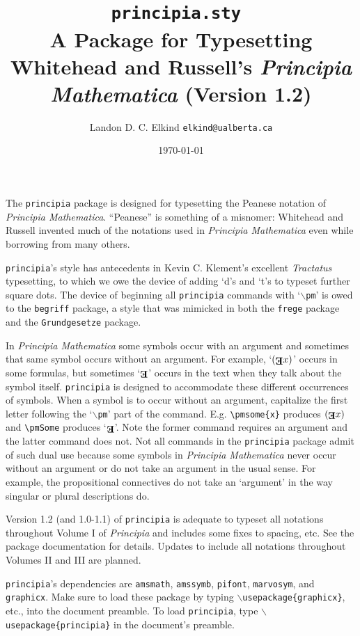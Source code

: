 \documentclass[12pt]{article}
\title{\texttt{principia.sty }\\ A \LaTeXe \space Package for Typesetting Whitehead and Russell's \textit{Principia Mathematica} (Version 1.2)}
\author{Landon D. C. Elkind \texttt{elkind@ualberta.ca}}
\date{\today}
\begin{document}
\maketitle
\onehalfspacing
The \texttt{principia} package is designed for typesetting the Peanese notation of \textit{Principia Mathematica}. ``Peanese'' is something of a misnomer: Whitehead and Russell invented much of the notations used in \textit{Principia Mathematica} even while borrowing from many others.

\texttt{principia}'s style has antecedents in Kevin C. Klement's excellent \textit{Tractatus} typesetting, to which we owe the device of adding `d's and `t's to typeset further square dots. The device of beginning all \texttt{principia} commands with `\texttt{$\backslash$pm}' is owed to the \texttt{begriff} package, a style that was mimicked in both the \texttt{frege} package and the \texttt{Grundgesetze} package. 

In \textit{Principia Mathematica} some symbols occur with an argument and sometimes that same symbol occurs without an argument. For example, `$\pmsome{x}$' occurs in some formulas, but sometimes `$\pmSome$' occurs in the text when they talk about the symbol itself. \texttt{principia} is designed to accommodate these different occurrences of symbols. When a symbol is to occur without an argument, capitalize the first letter following the `\texttt{$\backslash$pm}' part of the command. E.g. \verb|\pmsome{x}| produces $\pmsome{x}$ and \verb|\pmSome| produces `$\pmSome$'. Note the former command requires an argument and the latter command does not. Not all commands in the \texttt{principia} package admit of such dual use because some symbols in \textit{Principia Mathematica} never occur without an argument or do not take an argument in the usual sense. For example, the propositional connectives do not take an `argument' in the way singular or plural descriptions do.

Version 1.2 (and 1.0-1.1) of \texttt{principia} is adequate to typeset all notations throughout Volume I of \textit{Principia} and includes some fixes to spacing, etc. See the package documentation for details. Updates to include all notations throughout Volumes II and III are planned.

\texttt{principia}'s dependencies are \texttt{amsmath}, \texttt{amssymb}, \texttt{pifont}, \texttt{marvosym}, and \texttt{graphicx}. Make sure to load these package by typing \texttt{$\backslash$usepackage\{graphicx\}}, etc., into the document preamble. To load \texttt{principia}, type \texttt{$\backslash$usepackage\{principia\}} in the document's preamble.
\end{document}
